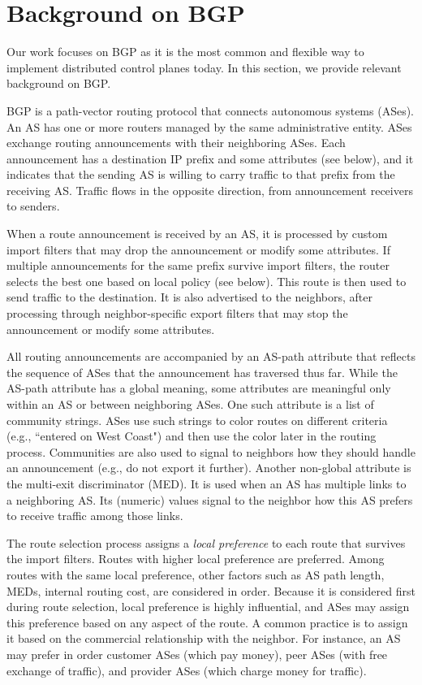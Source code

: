 \section{Background on BGP}
\label{sec:background}

Our work focuses on BGP as it is the most common and flexible way to implement distributed control planes today. In this section, we provide relevant background on BGP.

BGP is a path-vector routing protocol that connects autonomous systems (ASes). An AS has one or more routers managed by the same administrative entity. ASes exchange routing announcements with their neighboring ASes. Each announcement has a destination IP prefix and some attributes (see below), and it indicates that the sending AS is willing to carry traffic to that prefix from the receiving AS. Traffic flows in the opposite direction, from announcement receivers to senders.

When a route announcement is received by an AS, it is processed by custom import filters that may drop the announcement or modify some attributes. If multiple announcements for the same prefix survive import filters, the router selects the best one based on local policy (see below). This route is then used to send traffic to the destination. It is also advertised to the neighbors, after processing through neighbor-specific export filters that may stop the announcement or modify some attributes.

All routing announcements are accompanied by an AS-path attribute that reflects the sequence of ASes that the announcement has traversed thus far. While the AS-path attribute has a global meaning, some attributes are meaningful only within an AS or between neighboring ASes.  One such attribute is a list of community strings. ASes use such strings to color routes on different criteria (e.g., ``entered on West Coast") and then use the color later in the routing process.  Communities are also used to signal to neighbors how they should handle an announcement (e.g., do not export it further). Another non-global attribute is the multi-exit discriminator (MED). It is used when an AS has multiple links to a neighboring AS.  Its (numeric) values signal to the neighbor how this AS prefers to receive traffic among those links.

The route selection process assigns a {\em local preference} to each route that survives the import filters. Routes with higher local preference are preferred. Among routes with the same local preference, other factors such as AS path length, MEDs, internal routing cost, are considered in order. Because it is considered first during route selection, local preference is highly influential, and ASes may assign this preference based on any aspect of the route. A common practice is to assign it based on the commercial relationship with the neighbor. For instance, an AS may prefer in order customer ASes (which pay money), peer ASes (with free exchange of traffic), and provider ASes (which charge money for traffic).

